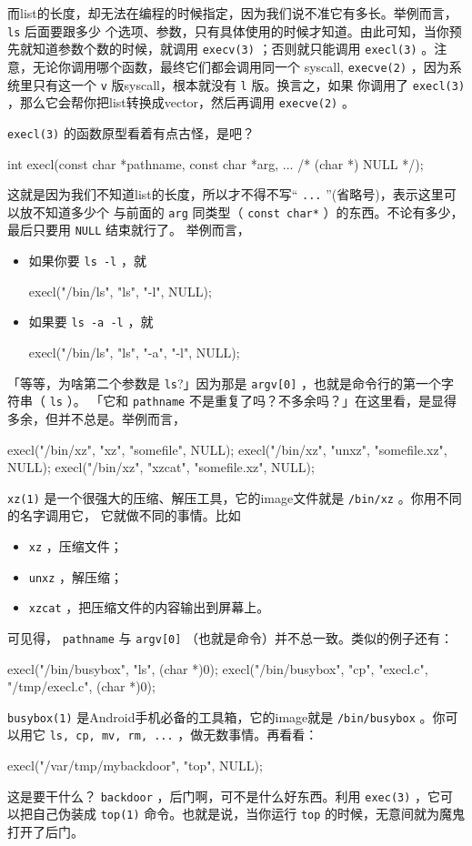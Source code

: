 \documentclass{wx672ctexart}
\begin{document}
而list的长度，却无法在编程的时候指定，因为我们说不准它有多长。举例而言， \texttt{ls} 后面要跟多少
个选项、参数，只有具体使用的时候才知道。由此可知，当你预先就知道参数个数的时候，就调用
\texttt{execv(3)} ；否则就只能调用 \texttt{execl(3)} 。注意，无论你调用哪个函数，最终它们都会调用同一个
syscall, \texttt{execve(2)} ，因为系统里只有这一个 \texttt{v} 版syscall，根本就没有 \texttt{l} 版。换言之，如果
你调用了 \texttt{execl(3)} ，那么它会帮你把list转换成vector，然后再调用 \texttt{execve(2)} 。

\texttt{execl(3)} 的函数原型看着有点古怪，是吧？
\begin{ccode}
int execl(const char *pathname, const char *arg, ...
				/* (char  *) NULL */);
\end{ccode}
这就是因为我们不知道list的长度，所以才不得不写“ \texttt{...} ”(省略号)，表示这里可以放不知道多少个
与前面的 \texttt{arg} 同类型（ \texttt{const char*} ）的东西。不论有多少，最后只要用 \texttt{NULL} 结束就行了。
举例而言，
\begin{itemize}
\item 如果你要 \texttt{ls -l} ，就
\begin{ccode}
execl("/bin/ls", "ls", "-l", NULL);
\end{ccode}
\item 如果要 \texttt{ls -a -l} ，就
\begin{ccode}
execl("/bin/ls", "ls", "-a", "-l", NULL);
\end{ccode}
\end{itemize}

「等等，为啥第二个参数是 \texttt{ls}?」因为那是 \texttt{argv[0]} ，也就是命令行的第一个字符串（ \texttt{ls} ）。
「它和 \texttt{pathname} 不是重复了吗？不多余吗？」在这里看，是显得多余，但并不总是。举例而言，
\begin{ccode}
execl("/bin/xz", "xz", "somefile", NULL);
execl("/bin/xz", "unxz", "somefile.xz", NULL);
execl("/bin/xz", "xzcat", "somefile.xz", NULL);
\end{ccode}
\texttt{xz(1)} 是一个很强大的压缩、解压工具，它的image文件就是 \texttt{/bin/xz} 。你用不同的名字调用它，
它就做不同的事情。比如
\begin{itemize}
\item \texttt{xz} ，压缩文件；
\item \texttt{unxz} ，解压缩；
\item \texttt{xzcat} ，把压缩文件的内容输出到屏幕上。
\end{itemize}
可见得， \texttt{pathname} 与 \texttt{argv[0]} （也就是命令）并不总一致。类似的例子还有：
\begin{ccode}
execl("/bin/busybox", "ls", (char *)0);
execl("/bin/busybox", "cp", "execl.c", "/tmp/execl.c", (char *)0);
\end{ccode}
\texttt{busybox(1)} 是Android手机必备的工具箱，它的image就是 \texttt{/bin/busybox} 。你可以用它 \texttt{ls, cp,
mv, rm, ...} ，做无数事情。再看看：
\begin{ccode}
execl("/var/tmp/mybackdoor", "top", NULL);
\end{ccode}
这是要干什么？ \texttt{backdoor} ，后门啊，可不是什么好东西。利用 \texttt{exec(3)} ，它可以把自己伪装成
\texttt{top(1)} 命令。也就是说，当你运行 \texttt{top} 的时候，无意间就为魔鬼打开了后门。
\end{document}
